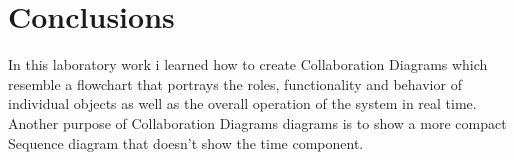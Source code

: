 \section*{Conclusions}
In this laboratory work i learned how to create Collaboration Diagrams which resemble a flowchart that portrays the roles, functionality and behavior of individual objects as well as the overall operation of the system in real time.
Another purpose of  Collaboration Diagrams diagrams is to show a more compact Sequence diagram that doesn't show the time component.
\clearpage